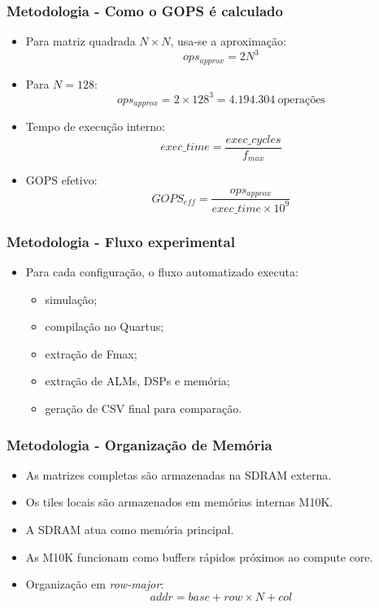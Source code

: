 \documentclass{beamer}
\begin{document}
\begin{frame}
\frametitle{Metodologia - Como o GOPS é calculado}

\begin{itemize}
    \item Para matriz quadrada \(N \times N\), usa-se a aproximação:
    \[
        ops_{approx} = 2N^3
    \]

    \item Para \(N=128\):
    \[
        ops_{approx}=2\times128^3=4.194.304\ \text{operações}
    \]

    \item Tempo de execução interno:
    \[
        exec\_time = \frac{exec\_cycles}{f_{max}}
    \]

    \item GOPS efetivo:
    \[
        GOPS_{eff}=\frac{ops_{approx}}{exec\_time\times10^9}
    \]
\end{itemize}

\end{frame}

\begin{frame}
\frametitle{Metodologia - Fluxo experimental}

\begin{itemize}
    \item Para cada configuração, o fluxo automatizado executa:
    \begin{itemize}
        \item simulação;
        \item compilação no Quartus;
        \item extração de Fmax;
        \item extração de ALMs, DSPs e memória;
        \item geração de CSV final para comparação.
    \end{itemize}
\end{itemize}

\end{frame}

\begin{frame}
\frametitle{Metodologia - Organização de Memória}

\begin{itemize}
    \item As matrizes completas são armazenadas na SDRAM externa.
    \item Os tiles locais são armazenados em memórias internas M10K.
    \item A SDRAM atua como memória principal.
    \item As M10K funcionam como buffers rápidos próximos ao compute core.
    \item Organização em \textit{row-major}:
    \[
        addr = base + row \times N + col
    \]
\end{itemize}

\end{frame}
\end{document}
